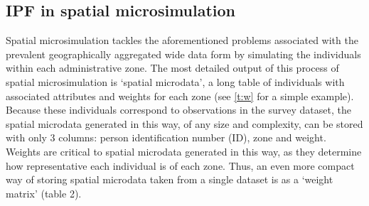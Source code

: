 \documentclass[a4paper,10pt]{article}
\begin{document}

\subsection{IPF in spatial microsimulation}
Spatial microsimulation tackles the aforementioned problems associated
with the prevalent geographically aggregated wide data form by simulating
the individuals within each administrative zone. The most detailed output of this process of 
spatial microsimulation is `spatial microdata', a long table of individuals with 
associated attributes and weights for each zone (see \cref{t:w} %
 for a simple example). 
Because these individuals correspond to observations in the survey dataset,
the spatial microdata generated in this way, of any size and complexity,
can be stored with only 3 columns: person identification number (ID), 
zone and weight. Weights are critical to spatial microdata generated in this way, as they 
determine how representative each individual is of each zone. Thus, an even more compact way 
of storing spatial microdata taken from a single dataset is as a `weight matrix' (table 2). 
\end{document}

